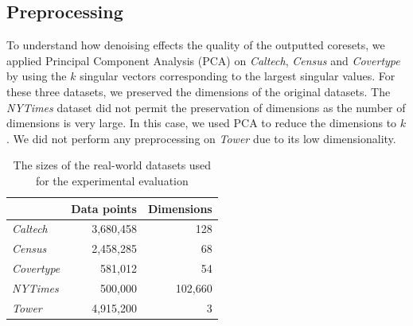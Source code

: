 \subsection{Preprocessing}
To understand how denoising effects the quality of the outputted coresets, we applied Principal Component Analysis (PCA) on \textit{Caltech}, \textit{Census} and \textit{Covertype} by using the $k$ singular vectors corresponding to the largest singular values. For these three datasets, we preserved the dimensions of the original datasets.  
The \textit{NYTimes} dataset did not permit the preservation of dimensions as the number of dimensions is very large. In this case, we used PCA to reduce the dimensions to $k$.
We did not perform any preprocessing on \textit{Tower} due to its low dimensionality.





%
\begin{table}
	\begin{center}%
	\caption{The sizes of the real-world datasets used for the experimental evaluation}
	\label{tab:real-world-datasets-overview}
	\begin{tabular}{lrr}
		\toprule
        
		    & Data points
		    & Dimensions
            \\
		\midrule
		\textit{Caltech}
    		& 3,680,458
    		& 128
    		\\
		\textit{Census}
    		& 2,458,285
    		& 68
    		\\
	    \textit{Covertype}
    	    & 581,012
    		& 54
    		\\
	    \textit{NYTimes}
    	    & 500,000
    		& 102,660
    		\\
        \textit{Tower}
            & 4,915,200
    		& 3
    		\\
		\bottomrule
	\end{tabular}\\
	\end{center}
\end{table}



